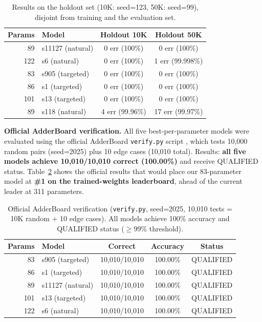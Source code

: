 \documentclass[11pt]{article}
\begin{document}
\begin{table}[t]
\centering
\caption{Results on the holdout set (10K: seed=123, 50K: seed=99),
disjoint from training and the evaluation set.}
\label{tab:holdout}
\vspace{4pt}
\small
\begin{tabular}{@{}rlcc@{}}
\toprule
Params & Model & Holdout 10K & Holdout 50K \\
\midrule
89  & s11127 (natural) & 0 err (100\%) & 0 err (100\%) \\
122 & s6 (natural)     & 0 err (100\%) & 1 err (99.998\%) \\
83  & s905 (targeted)  & 0 err (100\%) & 0 err (100\%) \\
86  & s1 (targeted)    & 0 err (100\%) & 0 err (100\%) \\
101 & s13 (targeted)   & 0 err (100\%) & 0 err (100\%) \\
89  & s118 (natural)   & 4 err (99.96\%) & 17 err (99.97\%) \\
\bottomrule
\end{tabular}
\end{table}

\textbf{Official AdderBoard verification.}
All five best-per-parameter models were evaluated using the official
AdderBoard \texttt{verify.py} script \citep{adderboard2025}, which tests
10,000 random pairs (seed=2025) plus 10 edge cases (10,010 total).
Results: \textbf{all five models achieve 10,010/10,010 correct (100.00\%)}
and receive QUALIFIED status.
Table~\ref{tab:verify} shows the official results that would place our
83-parameter model at \textbf{\#1 on the trained-weights leaderboard},
ahead of the current leader at 311 parameters.

\begin{table}[t]
\centering
\caption{Official AdderBoard verification (\texttt{verify.py}, seed=2025,
10,010 tests = 10K random + 10 edge cases). All models achieve 100\%
accuracy and QUALIFIED status ($\geq$99\% threshold).}
\label{tab:verify}
\vspace{4pt}
\small
\begin{tabular}{@{}rlccc@{}}
\toprule
Params & Model & Correct & Accuracy & Status \\
\midrule
83  & s905 (targeted)  & 10,010/10,010 & 100.00\% & QUALIFIED \\
86  & s1 (targeted)    & 10,010/10,010 & 100.00\% & QUALIFIED \\
89  & s11127 (natural) & 10,010/10,010 & 100.00\% & QUALIFIED \\
101 & s13 (targeted)   & 10,010/10,010 & 100.00\% & QUALIFIED \\
122 & s6 (natural)     & 10,010/10,010 & 100.00\% & QUALIFIED \\
\bottomrule
\end{tabular}
\end{table}
\end{document}
